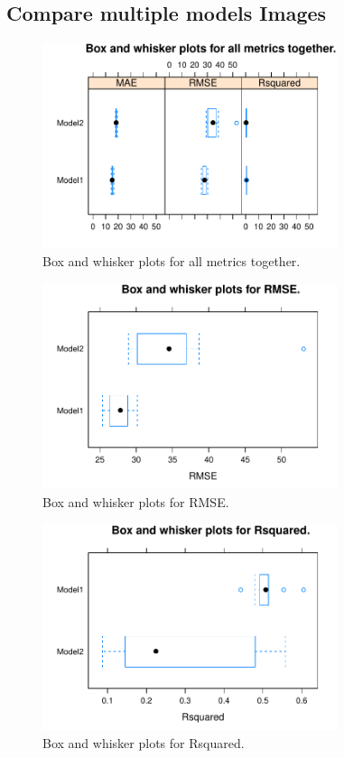 
\subsection{Compare multiple models Images} 
 

\begin{figure} 
\centering  
\includegraphics[width=0.77\textwidth]{Code_Outputs/ML_compare_models_bwplot_all.pdf} 
\caption{\label{fig:ML_compare_modelsbwplot_all}Box and whisker plots for all metrics together.} 
\end{figure} 
 

\begin{figure} 
\centering  
\includegraphics[width=0.77\textwidth]{Code_Outputs/ML_compare_models_bwplot_RMSE.pdf} 
\caption{\label{fig:ML_compare_modelsbwplot_RMSE}Box and whisker plots for RMSE.} 
\end{figure} 
 

\begin{figure} 
\centering  
\includegraphics[width=0.77\textwidth]{Code_Outputs/ML_compare_models_bwplot_Rsquared.pdf} 
\caption{\label{fig:ML_compare_modelsbwplot_Rsquared}Box and whisker plots for Rsquared.} 
\end{figure} 
 

